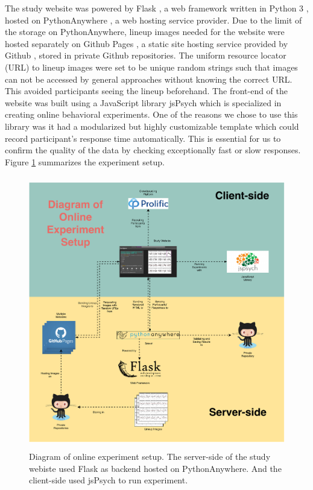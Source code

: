 \documentclass{monashthesis}
\begin{document}
The study website was powered by Flask \autocite{grinberg_flask_2018}, a web framework written in Python 3 \autocite{van_rossum_python_2009}, hosted on PythonAnywhere \autocite{pythonanywhere_pythonanywhere_2022}, a web hosting service provider. Due to the limit of the storage on PythonAnywhere, lineup images needed for the website were hosted separately on Github Pages \autocite{gtihub_github_2022-1}, a static site hosting service provided by Github \autocite{gtihub_github_2022}, stored in private Github repositories. The uniform resource locator (URL) to lineup images were set to be unique random strings such that images can not be accessed by general approaches without knowing the correct URL. This avoided participants seeing the lineup beforehand. The front-end of the website was built using a JavaScript \autocite{flanagan_javascript_2006} library jsPsych \autocite{de_leeuw_jspsych_2015} which is specialized in creating online behavioral experiments. One of the reasons we chose to use this library was it had a modularized but highly customizable template which could record participant's response time automatically. This is essential for us to confirm the quality of the data by checking exceptionally fast or slow responses. Figure \ref{fig:DiagramExperiment} summarizes the experiment setup.

\begin{figure}
\centering
\includegraphics[width=4.6875in,height=4.6875in]{figures/experiment_tech.pdf}
\caption{Diagram of online experiment setup. The server-side of the study webiste used Flask as backend hosted on PythonAnywhere. And the client-side used jsPsych to run experiment. \label{fig:DiagramExperiment}}
\end{figure}
\end{document}

